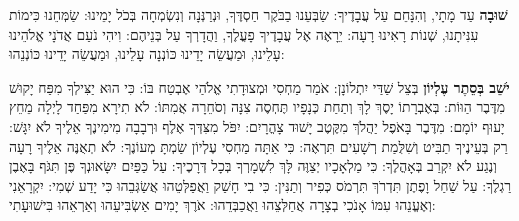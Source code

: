


\divider


\textbf{שׁוּבָה} \Shem{} עַד מָתָי, וְהִנָּחֵם עַל עֲבָדֶיךָ: שַׂבְּעֵנוּ בַבֹּקֶר חַסְדֶּךָ, וּנְרַנְּנָה וְנִשְׂמְחָה בְּכֹל יָמֵינוּ: שַׂמְּחֵנוּ כִּימוֹת עִנִּיתָנוּ, שְׁנוֹת רָאִינוּ רָעָה: יֵרָאֶה אֶל עֲבָדֶיךָ פָעֳלֶךָ, וַהֲדָרְךָ עַל בְּנֵיהֶם: וִיהִי נֹעַם אֲדֹנָי אֱלֹהֵינוּ עָלֵינוּ, וּמַעֲשֵׂה יָדֵינוּ כּוֹנְנָה עָלֵינוּ, וּמַעֲשֵׂה יָדֵינוּ כּוֹנְנֵהוּ:

\textbf{יֹשֵׁב בְּסֵתֶר עֶלְיוֹן} בְּצֵל שַׁדַּי יִתְלוֹנָן: אֹמַר  מַחְסִי וּמְצוּדָתִי אֱלֹהַי אֶבְטַח בּוֹ: כִּי הוּא יַצִּילְךָ מִפַּח יָקוּשׁ מִדֶּבֶר הַוּוֹת: בְּאֶבְרָתוֹ יָסֶךְ לָךְ וְתַחַת כְּנָפָיו תֶּחְסֶה צִנָּה וְסֹחֵרָה אֲמִתּוֹ: לֹא תִירָא מִפַּחַד לָיְלָה מֵחֵץ יָעוּף יוֹמָם: מִדֶּבֶר בָּאֹפֶל יַהֲלֹךְ מִקֶּטֶב יָשׁוּד צָהֳרָיִם: יִפֹּל מִצִּדְּךָ אֶלֶף וּרְבָבָה מִימִינֶךָ אֵלֶיךָ לֹא יִגָּשׁ: רַק בְּעֵינֶיךָ תַבִּיט וְשִׁלֻּמַת רְשָׁעִים תִּרְאֶה: כִּי אַתָּה \Shem{} מַחְסִי עֶלְיוֹן שַׂמְתָּ מְעוֹנֶךָ: לֹא תְאֻנֶּה אֵלֶיךָ רָעָה וְנֶגַע לֹא יִקְרַב בְּאָהֳלֶךָ: כִּי מַלְאָכָיו יְצַוֶּה לָּךְ לִשְׁמָרְךָ בְּכָל דְּרָכֶיךָ: עַל כַּפַּיִם יִשָּׂאוּנְךָ פֶּן תִּגֹּף בָּאֶבֶן רַגְלֶךָ: עַל שַׁחַל וָפֶתֶן תִּדְרֹךְ תִּרְמֹס כְּפִיר וְתַנִּין: כִּי בִי חָשַׁק וַאֲפַלְּטֵהוּ אֲשַׂגְּבֵהוּ כִּי יָדַע שְׁמִי: יִקְרָאֵנִי וְאֶעֱנֵהוּ עִמּוֹ אָנֹכִי בְצָרָה אֲחַלְּצֵהוּ וַאֲכַבְּדֵהוּ: אֹרֶךְ יָמִים אַשְׂבִּיעֵהוּ וְאַרְאֵהוּ בִּישׁוּעָתִי:

